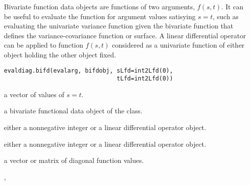 \documentclass{article}
\begin{document}
\begin{Description}\relax
Bivariate function data objects are functions of
two arguments, $f(s,t)$.  It can be useful to evaluate
the function for argument values satisying $s=t$, such
as evaluating the univariate variance function given the
bivariate function that defines the variance-covariance
function or surface.  A linear differential operator can
be applied to function $f(s,t)$ considered as a univariate
function of either object holding the other object fixed.
\end{Description}
\begin{Usage}
\begin{verbatim}
evaldiag.bifd(evalarg, bifdobj, sLfd=int2Lfd(0),
                                tLfd=int2Lfd(0))
\end{verbatim}
\end{Usage}
\begin{Arguments}
\begin{ldescription}
\item[\code{evalarg}] a vector of values of $s = t$.

\item[\code{bifdobj}] a bivariate functional data object of the  class.

\item[\code{sLfd}] either a nonnegative integer or a linear differential operator
object.

\item[\code{tLfd}] either a nonnegative integer or a linear differential operator
object.

\end{ldescription}
\end{Arguments}
\begin{Value}
a vector or matrix of diagonal function values.
\end{Value}
\begin{SeeAlso}\relax
{}, 
\end{SeeAlso}
\end{document}
